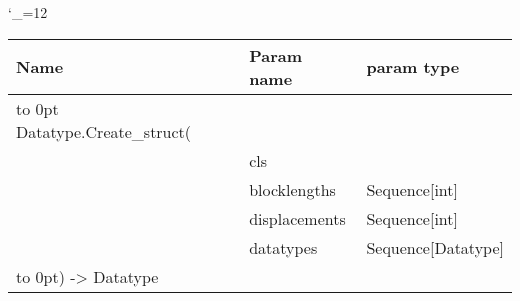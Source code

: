 \begingroup \catcode`\_=12 \tt
\begin{tabular}{lll}
\toprule
\textrm{Name}&\textrm{Param name}&\textrm{param type}\\
\midrule
\hbox to 0pt {Datatype.Create_struct(\hss}\\
& cls\\
& blocklengths & Sequence[int]\\
& displacements & Sequence[int]\\
& datatypes & Sequence[Datatype]\\
\hbox to 0pt{) -> Datatype\hss}\\
\bottomrule
\end{tabular}
\endgroup

